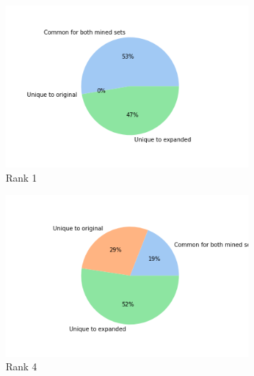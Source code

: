     
    \begin{figure}[htbp]
        \centering
        \begin{subfigure}[b]{0.3\textwidth}
            \centering
            \includegraphics[width=\textwidth]{figures/results/ranks/pie_charts/('rank_cutoff', 1)_wn18rr.png}
            \caption[]%
            {{\small Rank 1}}    
            \label{fig:rank_1_pie_wn18rr}
        \end{subfigure}
        \begin{subfigure}[b]{0.3\textwidth}  
            \centering 
            \includegraphics[width=\textwidth]{figures/results/ranks/pie_charts/('rank_cutoff', 4)_wn18rr.png}
            \caption[]%
            {{\small Rank 4}}    
            \label{fig:rank_4_pie_wn18rr}
        \end{subfigure}
        \begin{subfigure}[b]{0.3\textwidth}   

\end{subfigure}
\end{figure}
